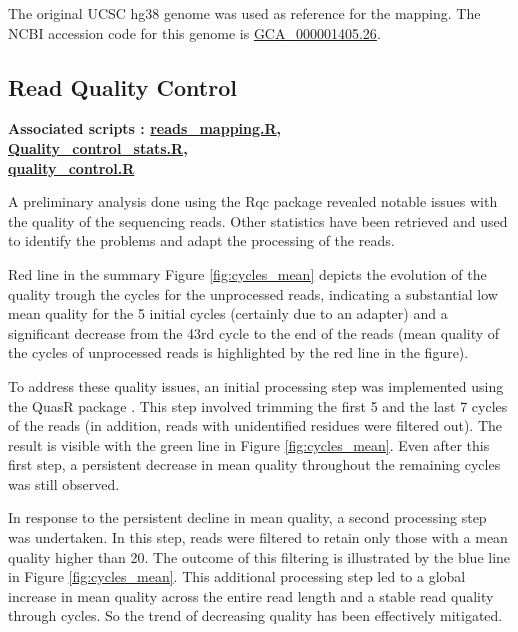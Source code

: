 \documentclass[a4paper, 11pt]{article}
\begin{document}
\begin{multicols}{2}
The original UCSC hg38 genome was used as reference for the mapping. The NCBI accession code for this genome is \href{https://www.ncbi.nlm.nih.gov/datasets/genome/GCF_000001405.26/}{GCA\_000001405.26}.


\subsection{Read Quality Control}
\begin{scriptsize}
	 \textbf{Associated scripts : \href{https://github.com/leopoldguyot/BINF-402_Transcriptomic_Project/blob/main/reads_mapping.R}{reads\_mapping.R},\\
	 	  \href{https://github.com/leopoldguyot/BINF-402_Transcriptomic_Project/blob/main/Quality_control_stats.R}{Quality\_control\_stats.R}, \\
	 	  \href{https://github.com/leopoldguyot/BINF-402_Transcriptomic_Project/blob/main/quality_control.R}{quality\_control.R}}
\end{scriptsize}


A preliminary analysis done using the Rqc package \citep{Rqc} revealed notable issues with the quality of the sequencing reads. Other statistics have been retrieved and used to identify the problems and adapt the processing of the reads. 

Red line in the summary Figure \ref{fig:cycles_mean} depicts the evolution of the quality trough the cycles for the unprocessed reads, indicating a substantial low mean quality for the 5 initial cycles (certainly due to an adapter) and a significant decrease from the 43rd cycle to the end of the reads (mean quality of the cycles of unprocessed reads is highlighted by the red line in the figure).

To address these quality issues, an initial processing step was implemented using the QuasR package \citep{QuasR}. This step involved trimming the first 5 and the last 7 cycles of the reads (in addition, reads with unidentified residues were filtered out). The result is visible with the green line in Figure \ref{fig:cycles_mean}. Even after this first step, a persistent decrease in mean quality throughout the remaining cycles was still observed.

In response to the persistent decline in mean quality, a second processing step was undertaken. In this step, reads were filtered to retain only those with a mean quality higher than 20. The outcome of this filtering is illustrated by the blue line in Figure \ref{fig:cycles_mean}. This additional processing step led to a global increase in mean quality across the entire read length and a stable read quality through cycles. So the trend of decreasing quality has been effectively mitigated.



\end{multicols}
\end{document}
